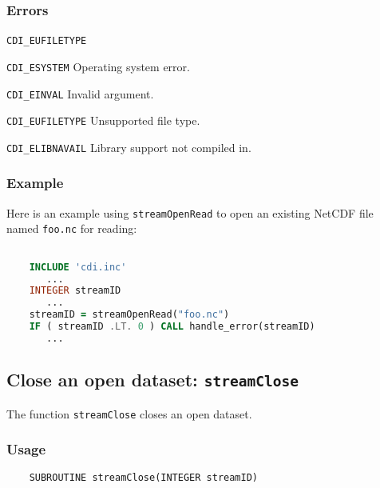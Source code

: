 \subsubsection*{Errors}


\hspace*{4mm}\begin{minipage}[]{15cm}
\begin{deflist}{\texttt{CDI\_EUFILETYPE}\ }
\item[\texttt{CDI\_ESYSTEM}]
Operating system error.
\item[\texttt{CDI\_EINVAL}]
Invalid argument.
\item[\texttt{CDI\_EUFILETYPE}]
Unsupported file type.
\item[\texttt{CDI\_ELIBNAVAIL}]
Library support not compiled in.
\end{deflist}
\end{minipage}


\subsubsection*{Example}

Here is an example using {\texttt{streamOpenRead}} to open an existing NetCDF
file named {\texttt{foo.nc}} for reading:

\begin{lstlisting}[language=Fortran, backgroundcolor=\color{pyellow}, basicstyle=\small, columns=flexible]

    INCLUDE 'cdi.inc'
       ...
    INTEGER streamID
       ...
    streamID = streamOpenRead("foo.nc")
    IF ( streamID .LT. 0 ) CALL handle_error(streamID)
       ...
\end{lstlisting}


\subsection{Close an open dataset: \texttt{streamClose}}
\label{streamClose}

The function {\texttt{streamClose}} closes an open dataset.

\subsubsection*{Usage}

\begin{verbatim}
    SUBROUTINE streamClose(INTEGER streamID)
\end{verbatim}

